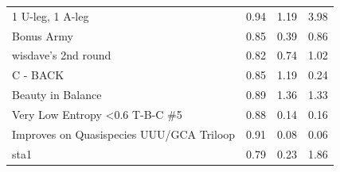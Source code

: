 \documentclass[letter]{bioinfo}
\begin{document}
\begin{center}
\begin{longtable}{l ccc}
1 U-leg, 1 A-leg				&0.94 	&1.19 	&3.98 \\
Bonus Army					&0.85 	&0.39 	&0.86 \\
wisdave's 2nd round			&0.82 	&0.74 	&1.02 \\
C - BACK						&0.85 	&1.19 	&0.24 \\
Beauty in Balance				&0.89 	&1.36 	&1.33 \\
Very Low Entropy <0.6 T-B-C \#5	&0.88 	&0.14 	&0.16 \\
Improves on Quasispecies UUU/GCA Triloop	&0.91 	&0.08 	&0.06 \\
sta1							&0.79 	&0.23 	&1.86 \\

\end{longtable}
\end{center}



\newpage



\end{document}
